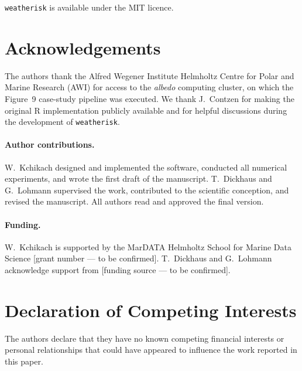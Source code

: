\documentclass[preprint,12pt,a4paper]{elsarticle}
\newcommand{\revg}[1]{{#1}}
\newcommand{\revn}[1]{{\color{RevisionViolet}#1}}
\begin{document}
\revg{\texttt{weatherisk} is available under the MIT licence.}

\section*{Acknowledgements}

The authors thank the Alfred Wegener Institute Helmholtz Centre for
Polar and Marine Research (AWI) for access to the \emph{albedo}
computing cluster, on which the Figure~9 case-study pipeline was
executed. We thank J.~Contzen for making the original R
implementation publicly available and for helpful discussions during
the development of \texttt{weatherisk}.

\paragraph*{Author contributions.}
W.~Kchikach designed and implemented the software, conducted all
numerical experiments, and wrote the first draft of the manuscript.
T.~Dickhaus and G.~Lohmann supervised the work, contributed to the
scientific conception, and revised the manuscript. All authors read
and approved the final version.

\paragraph*{Funding.}
W.~Kchikach is supported by the MarDATA Helmholtz School for Marine
Data Science [grant number --- to be confirmed]. T.~Dickhaus and
G.~Lohmann acknowledge support from [funding source --- to be confirmed].

\section*{\revn{Declaration of Competing Interests}}

\revn{The authors declare that they have no known competing financial
interests or personal relationships that could have appeared to
influence the work reported in this paper.}

\appendix
\end{document}
